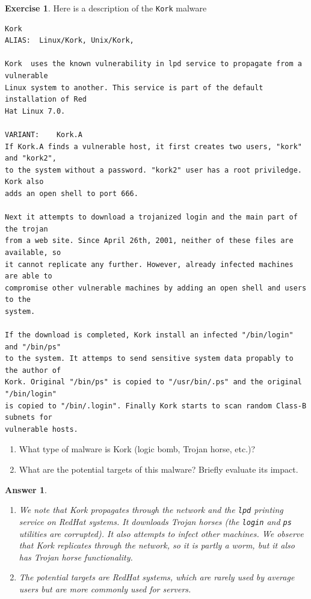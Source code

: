 \documentclass[a4paper,11pt]{article}
\theoremstyle{plain}
\newtheorem{correction}{Answer}
\theoremstyle{definition}
\newtheorem{exercice}{Exercise}
\begin{document}
\begin{exercice}
Here is a description of the \texttt{Kork} malware
\begin{verbatim}
Kork
ALIAS:	Linux/Kork, Unix/Kork,

Kork  uses the known vulnerability in lpd service to propagate from a vulnerable
Linux system to another. This service is part of the default installation of Red
Hat Linux 7.0.

VARIANT:	Kork.A
If Kork.A finds a vulnerable host, it first creates two users, "kork" and "kork2",
to the system without a password. "kork2" user has a root priviledge. Kork also
adds an open shell to port 666.

Next it attempts to download a trojanized login and the main part of the trojan
from a web site. Since April 26th, 2001, neither of these files are available, so
it cannot replicate any further. However, already infected machines are able to
compromise other vulnerable machines by adding an open shell and users to the
system.

If the download is completed, Kork install an infected "/bin/login" and "/bin/ps"
to the system. It attemps to send sensitive system data propably to the author of
Kork. Original "/bin/ps" is copied to "/usr/bin/.ps" and the original "/bin/login"
is copied to "/bin/.login". Finally Kork starts to scan random Class-B subnets for
vulnerable hosts.
\end{verbatim}

\begin{enumerate}
\item What type of malware is Kork (logic bomb, Trojan horse, etc.)?
\item What are the potential targets of this malware? Briefly evaluate its impact.
\end{enumerate}
\end{exercice}

\begin{correction}
\begin{enumerate}
\item We note that Kork propagates through the network and the \texttt{lpd} printing service on RedHat systems. It downloads Trojan horses (the \texttt{login} and \texttt{ps} utilities are corrupted). It also attempts to infect other machines. We observe that Kork replicates through the network, so it is partly a worm, but it also has Trojan horse functionality.
\item The potential targets are RedHat systems, which are rarely used by average users but are more commonly used for servers.
\end{enumerate}

\end{correction}
\end{document}
